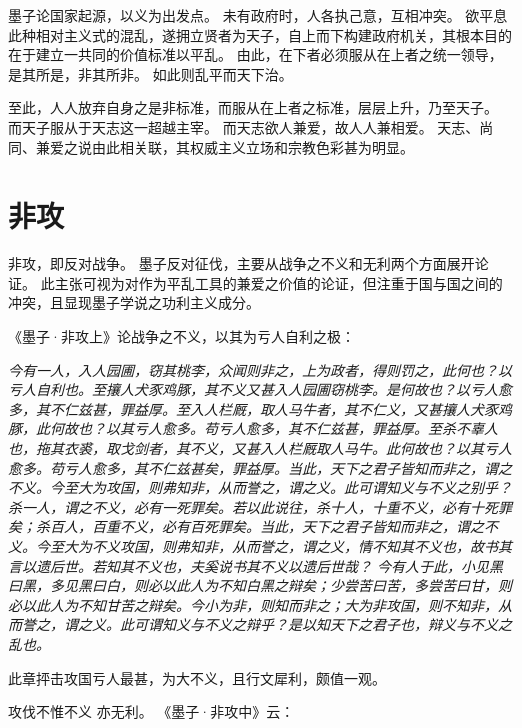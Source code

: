 \documentclass[11pt]{article}
\begin{document}
墨子论国家起源，以义为出发点。
未有政府时，人各执己意，互相冲突。
欲平息此种相对主义式的混乱，遂拥立贤者为天子，自上而下构建政府机关，其根本目的在于建立一共同的价值标准以平乱。
由此，在下者必须服从在上者之统一领导，是其所是，非其所非。
如此则乱平而天下治。

\newline

至此，人人放弃自身之是非标准，而服从在上者之标准，层层上升，乃至天子。
而天子服从于天志这一超越主宰。
而天志欲人兼爱，故人人兼相爱。
天志、尚同、兼爱之说由此相关联，其权威主义立场和宗教色彩甚为明显。

\section{非攻}
非攻，即反对战争。
墨子反对征伐，主要从战争之不义和无利两个方面展开论证。
此主张可视为对作为平乱工具的兼爱之价值的论证，但注重于国与国之间的冲突，且显现墨子学说之功利主义成分。

\newline

《墨子·非攻上》论战争之不义，以其为亏人自利之极：

\textit{今有一人，入人园圃，窃其桃李，众闻则非之，上为政者，得则罚之，此何也？以亏人自利也。至攘人犬豕鸡豚，其不义又甚入人园圃窃桃李。是何故也？以亏人愈多，其不仁兹甚，罪益厚。至入人栏厩，取人马牛者，其不仁义，又甚攘人犬豕鸡豚，此何故也？以其亏人愈多。苟亏人愈多，其不仁兹甚，罪益厚。至杀不辜人也，拖其衣裘，取戈剑者，其不义，又甚入人栏厩取人马牛。此何故也？以其亏人愈多。苟亏人愈多，其不仁兹甚矣，罪益厚。当此，天下之君子皆知而非之，谓之不义。今至大为攻国，则弗知非，从而誉之，谓之义。此可谓知义与不义之别乎？
\newline
杀一人，谓之不义，必有一死罪矣。若以此说往，杀十人，十重不义，必有十死罪矣；杀百人，百重不义，必有百死罪矣。当此，天下之君子皆知而非之，谓之不义。今至大为不义攻国，则弗知非，从而誉之，谓之义，情不知其不义也，故书其言以遗后世。若知其不义也，夫奚说书其不义以遗后世哉？ 今有人于此，小见黑曰黑，多见黑曰白，则必以此人为不知白黑之辩矣；少尝苦曰苦，多尝苦曰甘，则必以此人为不知甘苦之辩矣。今小为非，则知而非之；大为非攻国，则不知非，从而誉之，谓之义。此可谓知义与不义之辩乎？是以知天下之君子也，辩义与不义之乱也。}

此章抨击攻国亏人最甚，为大不义，且行文犀利，颇值一观。

\newline

攻伐不惟不义 亦无利。
《墨子·非攻中》云：
\end{document}
